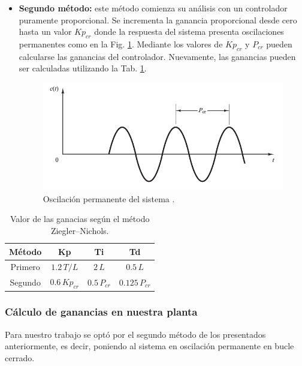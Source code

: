 \begin{itemize}
 \item \textbf{Segundo método:}
 este método comienza su análisis con un controlador puramente proporcional.
 Se incrementa  la ganancia proporcional desde cero hasta un valor $Kp_{cr} $
donde la respuesta del  sistema presenta oscilaciones permanentes como en la
Fig. \ref{fig:segundometodo}.
 Mediante los valores de $Kp_{cr} $ y $P_{cr}$ pueden calcularse las ganancias
del controlador.
Nuevamente, las ganancias pueden ser calculadas utilizando la Tab.
\ref{tab:valorganancias}.
\begin{figure}[ht]
 \centering
 \includegraphics[scale=0.5]{Cap4-ProgramacionPLC/images/segundometodo.png}
 \caption{Oscilación permanente del sistema \cite{bib:Ogata}.}
 \label{fig:segundometodo}
\end{figure}
\end{itemize}

\begin{table}[!t]
\renewcommand{\arraystretch}{1.3}
\centering
\begin{tabular}{c||c||c |c}
\hline
\bfseries Método & \bfseries Kp  & \bfseries Ti & \bfseries Td\\
\hline \hline
Primero &  $ 1.2 \, {T}/{L}$ & $2 \, L $ & $ 0.5 \, L $\\
\hline
Segundo &  $0.6 \,Kp_{cr}  $ & $ 0.5 \, P_{cr}$ & $0.125 \, P_{cr} $\\
\hline
\end{tabular}
\caption{Valor de las ganacias según el método Ziegler–Nichols.}
\label{tab:valorganancias}
\end{table}

\subsubsection{Cálculo de ganancias en nuestra planta}

Para nuestro trabajo se optó por el segundo método de los presentados
anteriormente, es decir, poniendo al sistema en oscilación permanente en bucle
cerrado.

